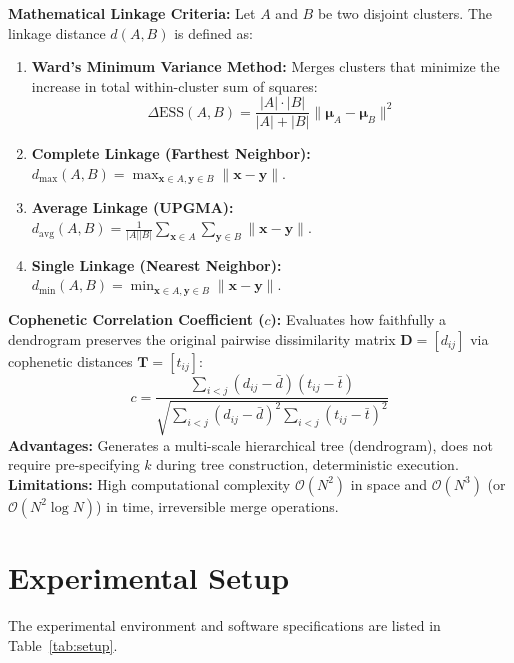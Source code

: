 \documentclass[12pt,a4paper]{article}
\begin{document}
\textbf{Mathematical Linkage Criteria:}
Let $A$ and $B$ be two disjoint clusters. The linkage distance $d(A, B)$ is defined as:
\begin{enumerate}[noitemsep]
    \item \textbf{Ward's Minimum Variance Method:} Merges clusters that minimize the increase in total within-cluster sum of squares:
    \begin{equation}
    \Delta \text{ESS}(A, B) = \frac{|A| \cdot |B|}{|A| + |B|} \|\boldsymbol{\mu}_A - \boldsymbol{\mu}_B\|^2
    \end{equation}
    \item \textbf{Complete Linkage (Farthest Neighbor):} $d_{\max}(A, B) = \max_{\mathbf{x} \in A, \mathbf{y} \in B} \|\mathbf{x} - \mathbf{y}\|$.
    \item \textbf{Average Linkage (UPGMA):} $d_{\text{avg}}(A, B) = \frac{1}{|A||B|} \sum_{\mathbf{x} \in A} \sum_{\mathbf{y} \in B} \|\mathbf{x} - \mathbf{y}\|$.
    \item \textbf{Single Linkage (Nearest Neighbor):} $d_{\min}(A, B) = \min_{\mathbf{x} \in A, \mathbf{y} \in B} \|\mathbf{x} - \mathbf{y}\|$.
\end{enumerate}
\textbf{Cophenetic Correlation Coefficient ($c$):} Evaluates how faithfully a dendrogram preserves the original pairwise dissimilarity matrix $\mathbf{D} = [d_{ij}]$ via cophenetic distances $\mathbf{T} = [t_{ij}]$:
\begin{equation}
c = \frac{\sum_{i < j} (d_{ij} - \bar{d})(t_{ij} - \bar{t})}{\sqrt{\sum_{i < j} (d_{ij} - \bar{d})^2 \sum_{i < j} (t_{ij} - \bar{t})^2}}
\end{equation}
\textbf{Advantages:} Generates a multi-scale hierarchical tree (dendrogram), does not require pre-specifying $k$ during tree construction, deterministic execution. \\
\textbf{Limitations:} High computational complexity $\mathcal{O}(N^2)$ in space and $\mathcal{O}(N^3)$ (or $\mathcal{O}(N^2 \log N)$) in time, irreversible merge operations.

\section{Experimental Setup}
The experimental environment and software specifications are listed in Table~\ref{tab:setup}.
\end{document}
